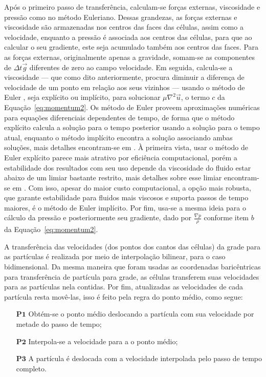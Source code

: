 \documentclass[12pt,a4paper,dvipsnames]{article}
\newcommand{\tb}[1]{\ensuremath{\textbf{#1}}}
\newcommand{\eqnref}[1]{Equação~\eqref{#1}}
\begin{document}
Após o primeiro passo de transferência, calculam-se forças externas, viscosidade e pressão como no método Euleriano. Dessas grandezas, as forças externas e viscosidade são armazenadas nos centros das faces das células, assim como a velocidade, enquanto a pressão é associada aos centros das células, para que ao calcular o seu gradiente, este seja acumulado também aos centros das faces. Para as forças externas, originalmente apenas a gravidade, somam-se as componentes de $\Delta t \Vec{g}$ diferentes de zero ao campo velocidade. Em seguida, calcula-se a viscosidade --- que como dito anteriormente, procura diminuir a diferença de velocidade de um ponto em relação aos seus vizinhos --- usando o método de Euler , seja explícito ou implícito, para solucionar $\mu\nabla^2\Vec{u}$, o termo $c$ da \eqnref{eq:momentum2}. Os método de Euler proveem aproximações numéricas para equações diferenciais dependentes de tempo, de forma que o método explícito calcula a solução para o tempo posterior usando a solução para o tempo atual, enquanto o método implícito encontra a solução associando ambas soluções, mais detalhes encontram-se em \cite{kim_2017}. À primeira vista, usar o método de Euler explícito parece mais atrativo por eficiência computacional, porém a estabilidade dos resultados com seu uso depende da viscosidade do fluido estar abaixo de um limiar bastante restrito, mais detalhes sobre esse limiar encontram-se em \cite{kim_2017}. Com isso, apesar do maior custo computacional, a opção mais robusta, que garante estabilidade para fluidos mais viscosos e suporta passos de tempo maiores, é o método de Euler implícito. Por fim, usa-se a mesma ideia para o cálculo da pressão e posteriormente seu gradiente, dado por $\frac{\nabla p}{\rho}$ conforme item $b$ da \eqnref{eq:momentum2}.

A transferência das velocidades (dos pontos dos cantos das células) da grade para as partículas é realizada por meio de interpolação bilinear, para o caso bidimensional. Da mesma maneira que foram usadas as coordenadas baricêntricas para transferência de partícula para grade, as células transferem suas velocidades para as partículas nela contidas. Por fim, atualizadas as velocidades de cada partícula resta movê-las, isso é feito pela regra do ponto médio, como segue:
\begin{itemize}
    \item [\tb{P1}] Obtém-se o ponto médio deslocando a partícula com sua velocidade por metade do passo de tempo;
    \item [\tb{P2}] Interpola-se a velocidade para a o ponto médio;
    \item [\tb{P3}] A partícula é deslocada com a velocidade interpolada pelo passo de tempo completo.
\end{itemize}
  
\end{document}
